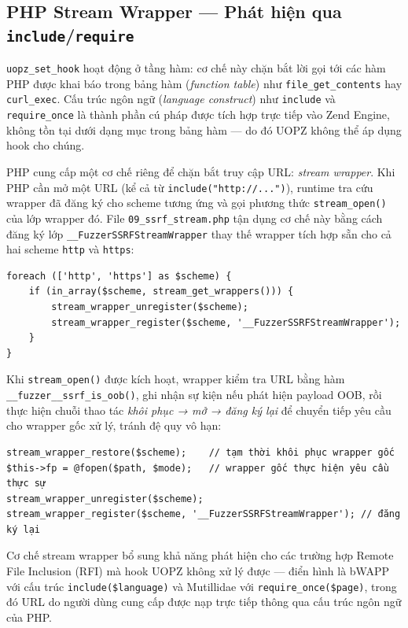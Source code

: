 \subsection{PHP Stream Wrapper --- Phát hiện qua \texttt{include}/\texttt{require}}
\label{subsec:stream-wrapper}

\texttt{uopz\_set\_hook} hoạt động ở tầng hàm: cơ chế này chặn bắt lời
gọi tới các hàm PHP được khai báo trong bảng hàm (\textit{function table})
như \texttt{file\_get\_contents} hay \texttt{curl\_exec}. Cấu trúc ngôn
ngữ (\textit{language construct}) như \texttt{include} và
\texttt{require\_once} là thành phần cú pháp được tích hợp trực tiếp vào
Zend Engine, không tồn tại dưới dạng mục trong bảng hàm --- do đó UOPZ
không thể áp dụng hook cho chúng.

PHP cung cấp một cơ chế riêng để chặn bắt truy cập URL: \textit{stream
wrapper}. Khi PHP cần mở một URL (kể cả từ
\texttt{include("http://...")}), runtime tra cứu wrapper đã đăng ký cho
scheme tương ứng và gọi phương thức \texttt{stream\_open()} của lớp
wrapper đó. File \texttt{09\_ssrf\_stream.php} tận dụng cơ chế này bằng
cách đăng ký lớp \texttt{\_\_FuzzerSSRFStreamWrapper} thay thế wrapper
tích hợp sẵn cho cả hai scheme \texttt{http} và \texttt{https}:

\begin{verbatim}
foreach (['http', 'https'] as $scheme) {
    if (in_array($scheme, stream_get_wrappers())) {
        stream_wrapper_unregister($scheme);
        stream_wrapper_register($scheme, '__FuzzerSSRFStreamWrapper');
    }
}
\end{verbatim}

Khi \texttt{stream\_open()} được kích hoạt, wrapper kiểm tra URL bằng
hàm \texttt{\_\_fuzzer\_\_ssrf\_is\_oob()}, ghi nhận sự kiện nếu phát
hiện payload OOB, rồi thực hiện chuỗi thao tác \textit{khôi phục →
mở → đăng ký lại} để chuyển tiếp yêu cầu cho wrapper gốc xử lý, tránh
đệ quy vô hạn:

\begin{verbatim}
stream_wrapper_restore($scheme);    // tạm thời khôi phục wrapper gốc
$this->fp = @fopen($path, $mode);   // wrapper gốc thực hiện yêu cầu thực sự
stream_wrapper_unregister($scheme);
stream_wrapper_register($scheme, '__FuzzerSSRFStreamWrapper'); // đăng ký lại
\end{verbatim}

Cơ chế stream wrapper bổ sung khả năng phát hiện cho các trường hợp
Remote File Inclusion (RFI) mà hook UOPZ không xử lý được --- điển hình
là bWAPP với cấu trúc \texttt{include(\$language)} và Mutillidae với
\texttt{require\_once(\$page)}, trong đó URL do người dùng cung cấp được
nạp trực tiếp thông qua cấu trúc ngôn ngữ của PHP.

